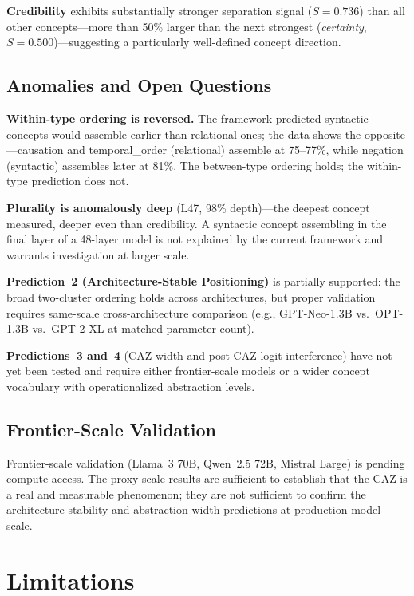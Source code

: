 \documentclass[11pt,a4paper]{article}
\begin{document}
\textbf{Credibility} exhibits substantially stronger separation signal ($S = 0.736$)
than all other concepts---more than 50\% larger than the next strongest
(\textit{certainty}, $S = 0.500$)---suggesting a particularly well-defined concept
direction.

\subsection{Anomalies and Open Questions}

\textbf{Within-type ordering is reversed.} The framework predicted syntactic concepts
would assemble earlier than relational ones; the data shows the opposite---causation
and temporal\_order (relational) assemble at 75--77\%, while negation (syntactic)
assembles later at 81\%. The between-type ordering holds; the within-type prediction
does not.

\textbf{Plurality is anomalously deep} (L47, 98\% depth)---the deepest concept
measured, deeper even than credibility. A syntactic concept assembling in the final
layer of a 48-layer model is not explained by the current framework and warrants
investigation at larger scale.

\textbf{Prediction~2 (Architecture-Stable Positioning)} is partially supported: the
broad two-cluster ordering holds across architectures, but proper validation requires
same-scale cross-architecture comparison (e.g., GPT-Neo-1.3B vs.\ OPT-1.3B vs.\
GPT-2-XL at matched parameter count).

\textbf{Predictions~3 and~4} (CAZ width and post-CAZ logit interference) have not yet
been tested and require either frontier-scale models or a wider concept vocabulary with
operationalized abstraction levels.

\subsection{Frontier-Scale Validation}

Frontier-scale validation (Llama~3 70B, Qwen~2.5 72B, Mistral Large) is pending compute
access. The proxy-scale results are sufficient to establish that the CAZ is a real and
measurable phenomenon; they are not sufficient to confirm the architecture-stability and
abstraction-width predictions at production model scale.

\section{Limitations}
\label{sec:limitations}
\end{document}
